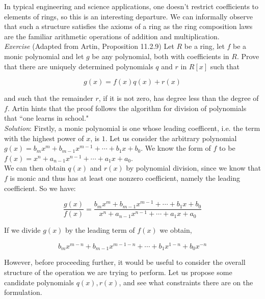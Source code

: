 In typical engineering and science applications, one doesn't restrict coefficients to elements of rings, so this is an interesting departure.  We can informally observe that such a structure satisfies the axioms of a ring as the ring composition laws are the familiar arithmetic operations of addition and multiplication.\\

\textit{Exercise} (Adapted from Artin, Proposition 11.2.9)  Let $R$ be a ring, let $f$ be a monic polynomial and let $g$ be any polynomial, both with coefficients in $R$.  Prove that there are uniquely determined polynomials $q$ and $r$ in $R[x]$ such that

\begin{displaymath}
g(x)=f(x)q(x)+r(x)
\end{displaymath}

and such that the remainder $r$, if it is not zero, has degree less than the degree of $f$.  Artin hints that the proof follows the algorithm for division of polynomials that ``one learns in school."\\

\textit{Solution}:  Firstly, a monic polynomial is one whose leading coefficent, i.e. the term with the highest power of $x$, is $1$.  Let us consider the arbitrary polynomial $g(x)=b_{m}x^{m}+b_{m-1}x^{m-1}+ \cdots + b_{1} x + b_{0}$.  We know the form of $f$ to be $f(x)=x^{n}+a_{n-1}x^{n-1}+\cdots+a_{1}x+a_{0}$.\\

We can then obtain $q(x)$ and $r(x)$ by polynomial division, since we know that $f$ is monic and thus has at least one nonzero coefficient, namely the leading coefficient.  So we have:

\begin{displaymath}
\frac{g(x)}{f(x)}=\frac{b_{m}x^{m}+b_{m-1}x^{m-1}+ \cdots + b_{1} x + b_{0}}{x^{n}+a_{n-1}x^{n-1}+\cdots+a_{1}x+a_{0}}
\end{displaymath}  

If we divide $g(x)$ by the leading term of $f(x)$ we obtain,

\begin{displaymath}
b_{m}x^{m-n}+b_{m-1}x^{m-1-n}+ \cdots + b_{1} x^{1-n} + b_{0}x^{-n}
\end{displaymath}

However, before proceeding further, it would be useful to consider the overall structure of the operation we are trying to perform.  Let us propose some candidate polynomials $q(x), r(x)$, and see what constraints there are on the formulation.\\

